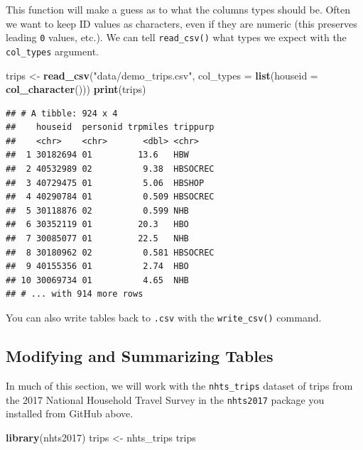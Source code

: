 \documentclass[
]{book}
\newenvironment{Shaded}{\begin{snugshade}}{\end{snugshade}}
\newcommand{\DataTypeTok}[1]{\textcolor[rgb]{0.13,0.29,0.53}{#1}}
\newcommand{\KeywordTok}[1]{\textcolor[rgb]{0.13,0.29,0.53}{\textbf{#1}}}
\newcommand{\NormalTok}[1]{#1}
\newcommand{\StringTok}[1]{\textcolor[rgb]{0.31,0.60,0.02}{#1}}
\begin{document}
This function will make a guess as to what the columns types should be. Often
we want to keep ID values as characters, even if they are numeric (this preserves
leading \texttt{0} values, etc.). We can tell \texttt{read\_csv()} what types we expect with
the \texttt{col\_types} argument.

\begin{Shaded}
\begin{Highlighting}[]
\NormalTok{trips <-}\StringTok{ }\KeywordTok{read_csv}\NormalTok{(}\StringTok{"data/demo_trips.csv"}\NormalTok{, }\DataTypeTok{col_types =} \KeywordTok{list}\NormalTok{(}\DataTypeTok{houseid =} \KeywordTok{col_character}\NormalTok{()))}
\KeywordTok{print}\NormalTok{(trips)}
\end{Highlighting}
\end{Shaded}

\begin{verbatim}
## # A tibble: 924 x 4
##    houseid  personid trpmiles trippurp
##    <chr>    <chr>       <dbl> <chr>   
##  1 30182694 01         13.6   HBW     
##  2 40532989 02          9.38  HBSOCREC
##  3 40729475 01          5.06  HBSHOP  
##  4 40290784 01          0.509 HBSOCREC
##  5 30118876 02          0.599 NHB     
##  6 30352119 01         20.3   HBO     
##  7 30085077 01         22.5   NHB     
##  8 30180962 02          0.581 HBSOCREC
##  9 40155356 01          2.74  HBO     
## 10 30069734 01          4.65  NHB     
## # ... with 914 more rows
\end{verbatim}

You can also write tables back to \texttt{.csv} with the \texttt{write\_csv()} command.

\hypertarget{modifying-and-summarizing-tables}{%
\subsection{Modifying and Summarizing Tables}\label{modifying-and-summarizing-tables}}

In much of this section, we will work with the \texttt{nhts\_trips} dataset of trips
from the 2017 National Household Travel Survey in the \texttt{nhts2017} package you
installed from GitHub above.

\begin{Shaded}
\begin{Highlighting}[]
\KeywordTok{library}\NormalTok{(nhts2017)}
\NormalTok{trips <-}\StringTok{ }\NormalTok{nhts_trips}
\NormalTok{trips}
\end{Highlighting}
\end{Shaded}
\end{document}
